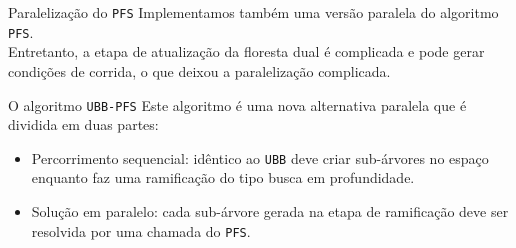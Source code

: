\documentclass{beamer}
\newcommand{\algname}[1]{\texttt{#1}}
\begin{document}
\begin{frame}{Paralelização do \algname{PFS}}
Implementamos também uma versão paralela do algoritmo \algname{PFS}.
\vspace{1em}
\pause\\

Entretanto, a etapa de atualização da floresta dual é complicada e pode 
gerar condições de corrida, o que deixou a paralelização complicada.
\end{frame}

\begin{frame}{O algoritmo \algname{UBB-PFS}}
Este algoritmo é uma nova alternativa paralela que é dividida em duas
partes:
\vspace{1em}
\pause\\
\begin{itemize}
  \item{Percorrimento sequencial: idêntico ao \algname{UBB} deve criar
    sub-árvores no espaço enquanto faz uma ramificação do tipo
    busca em profundidade.}
  \pause
  \item{Solução em paralelo: cada sub-árvore gerada na etapa de 
    ramificação deve ser resolvida por uma chamada do \algname{PFS}.}
\end{itemize}
\end{frame}
\end{document}
